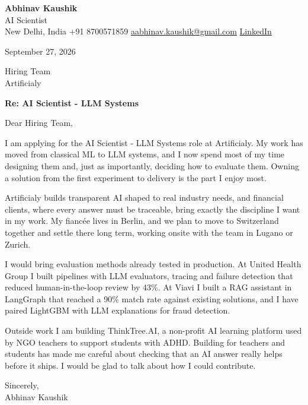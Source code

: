 \documentclass[11pt,a4paper]{article}
\begin{document}
{\Large\bfseries Abhinav Kaushik}\\
AI Scientist\\
New Delhi, India \textbar{} +91 8700571859 \textbar{} \href{mailto:aabhinav.kaushik@gmail.com}{aabhinav.kaushik@gmail.com} \textbar{} \href{https://www.linkedin.com/in/abhinav-kaushik10/}{LinkedIn}  

September 27, 2026

Hiring Team\\
Artificialy

\textbf{Re: AI Scientist - LLM Systems}

Dear Hiring Team,

I am applying for the AI Scientist - LLM Systems role at Artificialy. My work has moved from classical ML to LLM systems, and I now spend most of my time designing them and, just as importantly, deciding how to evaluate them. Owning a solution from the first experiment to delivery is the part I enjoy most.

Artificialy builds transparent AI shaped to real industry needs, and financial clients, where every answer must be traceable, bring exactly the discipline I want in my work. My fiancée lives in Berlin, and we plan to move to Switzerland together and settle there long term, working onsite with the team in Lugano or Zurich.

I would bring evaluation methods already tested in production. At United Health Group I built pipelines with LLM evaluators, tracing and failure detection that reduced human-in-the-loop review by 43\%. At Viavi I built a RAG assistant in LangGraph that reached a 90\% match rate against existing solutions, and I have paired LightGBM with LLM explanations for fraud detection.

Outside work I am building ThinkTree.AI, a non-profit AI learning platform used by NGO teachers to support students with ADHD. Building for teachers and students has made me careful about checking that an AI answer really helps before it ships. I would be glad to talk about how I could contribute.

Sincerely,\\[4pt]
Abhinav Kaushik
\end{document}
